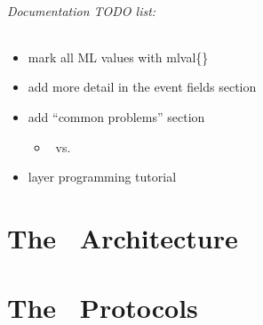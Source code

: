 \documentclass[11pt]{article}
\begin{document}
\paragraph{Documentation TODO list:}
\begin{itemize}
\item mark all ML values with mlval\{\}
\item add more detail in the event fields section
\item add ``common problems'' section
\begin{itemize}
\item \EInit\ vs. \EView
\end{itemize}
\item layer programming tutorial
\end{itemize}

\newpage
\part{The \ensemble\ Architecture}






%

\newpage
\part{The \ensemble\ Protocols}

\appendix



\end{document}
